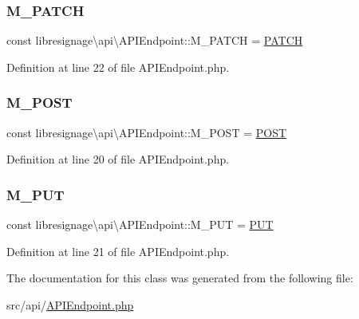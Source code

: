 \subsubsection{\texorpdfstring{M\+\_\+\+P\+A\+T\+CH}{M\_PATCH}}
{\footnotesize\ttfamily const libresignage\textbackslash{}api\textbackslash{}\+A\+P\+I\+Endpoint\+::\+M\+\_\+\+P\+A\+T\+CH = \textquotesingle{}\hyperlink{classlibresignage_1_1api_1_1APIEndpoint_a25047a0cb7abd12254382ad8c217d80e}{P\+A\+T\+CH}\textquotesingle{}}



Definition at line 22 of file A\+P\+I\+Endpoint.\+php.

\mbox{\label{classlibresignage_1_1api_1_1APIEndpoint_a7c998b0133ffbab696e94e7278559f7d}} 
\subsubsection{\texorpdfstring{M\+\_\+\+P\+O\+ST}{M\_POST}}
{\footnotesize\ttfamily const libresignage\textbackslash{}api\textbackslash{}\+A\+P\+I\+Endpoint\+::\+M\+\_\+\+P\+O\+ST = \textquotesingle{}\hyperlink{classlibresignage_1_1api_1_1APIEndpoint_a82763ffe46183716a1fc6bdb28599539}{P\+O\+ST}\textquotesingle{}}



Definition at line 20 of file A\+P\+I\+Endpoint.\+php.

\mbox{\label{classlibresignage_1_1api_1_1APIEndpoint_aefaba0cb4e292122cc0c57a1898a6b9a}} 
\subsubsection{\texorpdfstring{M\+\_\+\+P\+UT}{M\_PUT}}
{\footnotesize\ttfamily const libresignage\textbackslash{}api\textbackslash{}\+A\+P\+I\+Endpoint\+::\+M\+\_\+\+P\+UT = \textquotesingle{}\hyperlink{classlibresignage_1_1api_1_1APIEndpoint_a2964043ac81d67c7f8009ffe3c23eac4}{P\+UT}\textquotesingle{}}



Definition at line 21 of file A\+P\+I\+Endpoint.\+php.



The documentation for this class was generated from the following file\+:\begin{DoxyCompactItemize}
\item 
src/api/\hyperlink{APIEndpoint_8php}{A\+P\+I\+Endpoint.\+php}\end{DoxyCompactItemize}

